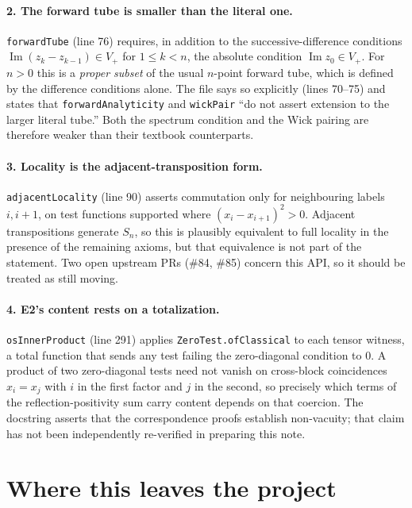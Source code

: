 \documentclass[11pt,a4paper]{article}
\newcommand{\lean}[1]{\texttt{#1}}
\newcommand{\Vplus}{V_{+}}
\begin{document}
\paragraph{2. The forward tube is smaller than the literal one.}
\lean{forwardTube} (line 76) requires, in addition to the successive-difference
conditions $\operatorname{Im}(z_k - z_{k-1}) \in \Vplus$ for $1 \le k < n$, the
absolute condition $\operatorname{Im} z_0 \in \Vplus$. For $n > 0$ this is a
\emph{proper subset} of the usual $n$-point forward tube, which is defined by the
difference conditions alone. The file says so explicitly (lines 70--75) and states
that \lean{forwardAnalyticity} and \lean{wickPair} ``do not assert extension to
the larger literal tube.'' Both the spectrum condition and the Wick pairing are
therefore weaker than their textbook counterparts.

\paragraph{3. Locality is the adjacent-transposition form.}
\lean{adjacentLocality} (line 90) asserts commutation only for neighbouring
labels $i, i+1$, on test functions supported where
$(x_i - x_{i+1})^2 > 0$. Adjacent transpositions generate $S_n$, so this is
plausibly equivalent to full locality in the presence of the remaining axioms,
but that equivalence is not part of the statement. Two open upstream PRs (\#84,
\#85) concern this API, so it should be treated as still moving.

\paragraph{4. E2's content rests on a totalization.}
\lean{osInnerProduct} (line 291) applies \lean{ZeroTest.ofClassical} to each
tensor witness, a total function that sends any test failing the zero-diagonal
condition to $0$. A product of two zero-diagonal tests need not vanish on
cross-block coincidences $x_i = x_j$ with $i$ in the first factor and $j$ in the
second, so precisely which terms of the reflection-positivity sum carry content
depends on that coercion. The docstring asserts that the correspondence proofs
establish non-vacuity; that claim has not been independently re-verified in
preparing this note.

\section{Where this leaves the project}
\end{document}
